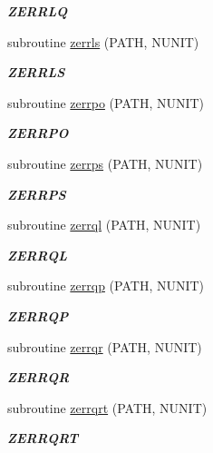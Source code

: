 \begin{DoxyCompactItemize}
\begin{DoxyCompactList}\small\item\em {\bfseries Z\+E\+R\+R\+L\+Q} \end{DoxyCompactList}\item 
subroutine \hyperlink{group__complex16__lin_ga7902904fb280c5f68ca406b8bf92db83}{zerrls} (P\+A\+T\+H, N\+U\+N\+I\+T)
\begin{DoxyCompactList}\small\item\em {\bfseries Z\+E\+R\+R\+L\+S} \end{DoxyCompactList}\item 
subroutine \hyperlink{group__complex16__lin_ga7de48323c06a0c6106e9b9c8398f09f0}{zerrpo} (P\+A\+T\+H, N\+U\+N\+I\+T)
\begin{DoxyCompactList}\small\item\em {\bfseries Z\+E\+R\+R\+P\+O} \end{DoxyCompactList}\item 
subroutine \hyperlink{group__complex16__lin_ga4b7585cc98106e8f34e416519b8de353}{zerrps} (P\+A\+T\+H, N\+U\+N\+I\+T)
\begin{DoxyCompactList}\small\item\em {\bfseries Z\+E\+R\+R\+P\+S} \end{DoxyCompactList}\item 
subroutine \hyperlink{group__complex16__lin_gae606cf8c7c51ec6432aba990fffb0ea7}{zerrql} (P\+A\+T\+H, N\+U\+N\+I\+T)
\begin{DoxyCompactList}\small\item\em {\bfseries Z\+E\+R\+R\+Q\+L} \end{DoxyCompactList}\item 
subroutine \hyperlink{group__complex16__lin_ga8afa865ee0ef67c83e27bca8cca5c311}{zerrqp} (P\+A\+T\+H, N\+U\+N\+I\+T)
\begin{DoxyCompactList}\small\item\em {\bfseries Z\+E\+R\+R\+Q\+P} \end{DoxyCompactList}\item 
subroutine \hyperlink{group__complex16__lin_gaf583cf9e4c399f2cdb9a7e900bdf89fc}{zerrqr} (P\+A\+T\+H, N\+U\+N\+I\+T)
\begin{DoxyCompactList}\small\item\em {\bfseries Z\+E\+R\+R\+Q\+R} \end{DoxyCompactList}\item 
subroutine \hyperlink{group__complex16__lin_ga7e7e4e33817626c315d85938b5880a43}{zerrqrt} (P\+A\+T\+H, N\+U\+N\+I\+T)
\begin{DoxyCompactList}\small\item\em {\bfseries Z\+E\+R\+R\+Q\+R\+T} \end{DoxyCompactList}\item 

\end{DoxyCompactItemize}
